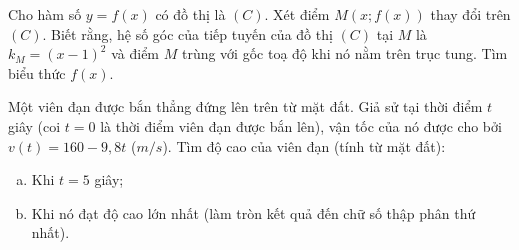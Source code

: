 \begin{bt}%
	Cho hàm số $y = f(x)$ có đồ thị là $(C)$. Xét điểm $M(x; f(x))$ thay đổi trên $(C)$. Biết rằng, hệ số góc của tiếp tuyến của đồ thị $(C)$ tại $M$ là $k_M = (x - 1)^2$ và điểm $M$ trùng với gốc toạ độ khi nó nằm trên trục tung. Tìm biểu thức $f(x)$.
\end{bt}

\begin{bt}%
	Một viên đạn được bắn thẳng đứng lên trên từ mặt đất. Giả sử tại thời điểm $t$ giây (coi $t = 0$ là thời điểm viên đạn được bắn lên), vận tốc của nó được cho bởi $v(t) = 160-9{,}8t$ ($m/s$). Tìm độ cao của viên đạn (tính từ mặt đất):
	\begin{enumerate}[a)]
		\item Khi $t = 5$ giây;
		\item Khi nó đạt độ cao lớn nhất (làm tròn kết quả đến chữ số thập phân thứ nhất).
	\end{enumerate}
\end{bt}


